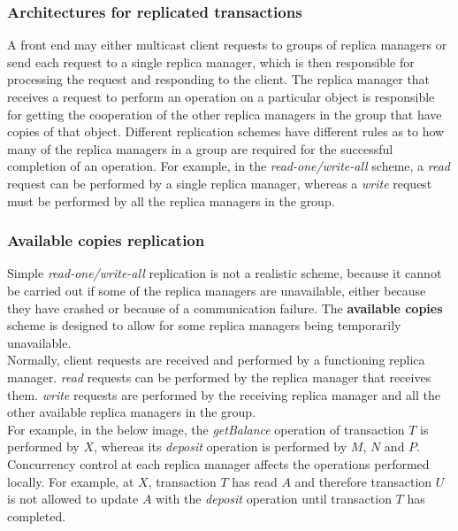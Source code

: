 \subsubsection{Architectures for replicated transactions}
A front end may either multicast client requests to groups of replica managers or send each request to a single replica manager, which is then responsible for processing the request and responding to the client. The replica manager that receives a request to perform an operation on a particular object is responsible for getting the cooperation of the other replica managers in the group that have copies of that object. Different replication schemes have different rules as to how many of the replica managers in a group are required for the successful completion of an operation. For example, in the \textit{read-one/write-all} scheme, a \textit{read} request can be performed by a single replica manager, whereas a \textit{write} request must be performed by all the replica managers in the group.

\subsubsection{Available copies replication}
Simple \textit{read-one/write-all} replication is not a realistic scheme, because it cannot be carried out if some of the replica managers are unavailable, either because they have crashed or because of a communication failure. The \textbf{available copies} scheme is designed to allow for some replica managers being temporarily unavailable.\\
Normally, client requests are received and performed by a functioning replica manager. \textit{read} requests can be performed by the replica manager that receives them. \textit{write} requests are performed by the receiving replica manager and all the other
available replica managers in the group.\\
For example, in the below image, the \textit{getBalance} operation of transaction $T$ is performed by $X$, whereas its \textit{deposit} operation is performed by $M$, $N$ and $P$. Concurrency control at each replica manager affects the operations performed locally. For example, at $X$, transaction $T$ has read $A$ and therefore transaction $U$ is not allowed to update $A$ with the \textit{deposit} operation until transaction $T$ has completed.

